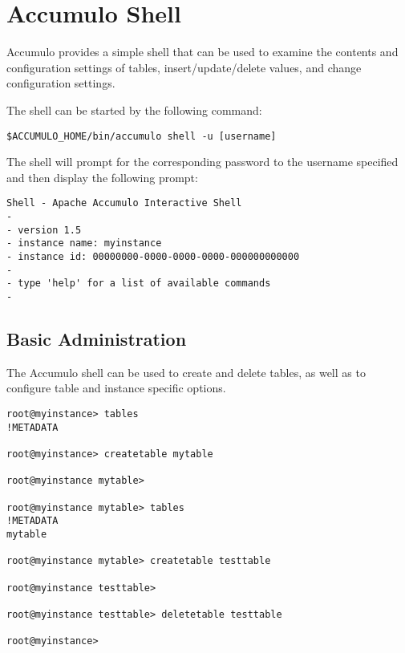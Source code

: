 
%
%

\chapter{Accumulo Shell} 
Accumulo provides a simple shell that can be used to examine the contents and
configuration settings of tables, insert/update/delete values, and change
configuration settings.  

The shell can be started by the following command:

\small
\begin{verbatim}
$ACCUMULO_HOME/bin/accumulo shell -u [username]
\end{verbatim}

\normalsize

The shell will prompt for the corresponding password to the username specified
and then display the following prompt:

\small
\begin{verbatim}
Shell - Apache Accumulo Interactive Shell
-
- version 1.5
- instance name: myinstance
- instance id: 00000000-0000-0000-0000-000000000000
-
- type 'help' for a list of available commands
-
\end{verbatim}
\normalsize

\section{Basic Administration}

The Accumulo shell can be used to create and delete tables, as well as to configure
table and instance specific options.

\small
\begin{verbatim}
root@myinstance> tables
!METADATA

root@myinstance> createtable mytable

root@myinstance mytable>

root@myinstance mytable> tables
!METADATA
mytable

root@myinstance mytable> createtable testtable

root@myinstance testtable>

root@myinstance testtable> deletetable testtable

root@myinstance>
\end{verbatim}
\normalsize

